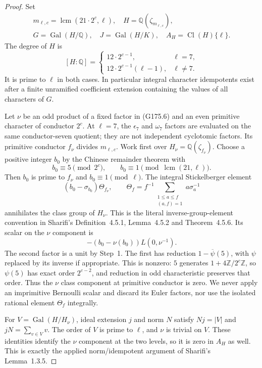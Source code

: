 \begin{proof}
Set
\[
 \begin{gathered}
 m_{\ell,c}=\operatorname{lcm}(21\cdot2^c,\ell),\quad
 H=\mathbb Q(\zeta_{m_{\ell,c}}),\\
 G=\operatorname{Gal}(H/\mathbb Q),\quad
 J=\operatorname{Gal}(H/K),\quad A_H=\operatorname{Cl}(H)\{\ell\}.
 \end{gathered}
 \tag{G175.10}
\]
The degree of $H$ is
\[
 [H:\mathbb Q]=
 \begin{cases}
  12\cdot2^{c-1},&\ell=7,\\
  12\cdot2^{c-1}(\ell-1),&\ell\ne7.
 \end{cases}
 \tag{G175.11}
\]
It is prime to $\ell$ in both cases.  In particular integral
character idempotents exist after a finite unramified coefficient
extension containing the values of all characters of $G$.

Let $\nu$ be an odd product of a fixed factor in (G175.6) and
an even primitive character of conductor $2^c$.
At $\ell=7$, the $\epsilon_7$ and $\omega_7$ factors are evaluated
on the same conductor-seven quotient; they are not independent
cyclotomic factors.
Its primitive conductor $f_\nu$ divides $m_{\ell,c}$.
Work first over $H_\nu=\mathbb Q(\zeta_{f_\nu})$.
Choose a positive integer $b_0$ by the Chinese remainder theorem with
\[
 b_0\equiv5\pmod {2^c},\qquad
                  b_0\equiv1\pmod {\operatorname{lcm}(21,\ell)}.
 \tag{G175.12}
\]
Then $b_0$ is prime to $f_\nu$ and $b_0\equiv1\pmod\ell$.
The integral Stickelberger element
\[
 (b_0-\sigma_{b_0})\Theta_{f_\nu},\qquad
 \Theta_f=f^{-1}\sum_{\substack{1\leq a\leq f\\(a,f)=1}}
                                      a\sigma_a^{-1}
 \tag{G175.13}
\]
annihilates the class group of $H_\nu$.
This is the literal inverse-group-element convention in Sharifi's
Definition~4.5.1, Lemma~4.5.2 and Theorem~4.5.6.
Its scalar on the $\nu$ component is
\[
             -(b_0-\nu(b_0))L(0,\nu^{-1}).
 \tag{G175.14}
\]
The second factor is a unit by Step~1.  The first has reduction
$1-\overline\psi(5)$, with $\psi$ replaced by its inverse if
appropriate.  This is nonzero: $5$ generates
$1+4\mathbb Z/2^c\mathbb Z$, so $\psi(5)$ has exact order
$2^{c-2}$, and reduction in odd characteristic preserves that order.
Thus the $\nu$ class component at primitive conductor is zero.
We never apply an imprimitive Bernoulli scalar and discard its Euler
factors, nor use the isolated rational element $\Theta_f$ integrally.

For $V=\operatorname{Gal}(H/H_\nu)$, ideal extension $j$ and norm
$N$ satisfy $Nj=|V|$ and $jN=\sum_{v\in V}v$.
The order of $V$ is prime to $\ell$, and $\nu$ is trivial on $V$.
These identities identify the $\nu$ component at the two levels,
so it is zero in $A_H$ as well.  This is exactly the applied
norm/idempotent argument of Sharifi's Lemma~1.3.5.


\end{proof}
